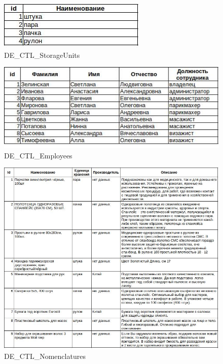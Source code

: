 \begin{figure}[!h]
    \centering

    \includegraphics[]
    {assets/etalons/CPR_EdinicyHraneniay.jpg}

    \caption{DE\_CTL\_StorageUnits}

    \label{fig:CPR_EdinicyHraneniay}
\end{figure}

\begin{figure}[!h]
    \centering

    \includegraphics[]
    {assets/etalons/CPR_Sotrudniki.jpg}

    \caption{DE\_CTL\_Employees}

    \label{fig:CPR_Sotrudniki}
\end{figure}

\begin{figure}[!h]
    \centering

    \includegraphics[width=17cm]
    {assets/etalons/CPR_Nomenklatura.jpg}

    \caption{DE\_CTL\_Nomenclatures}

    \label{fig:CPR_Nomenklatura}
\end{figure}

